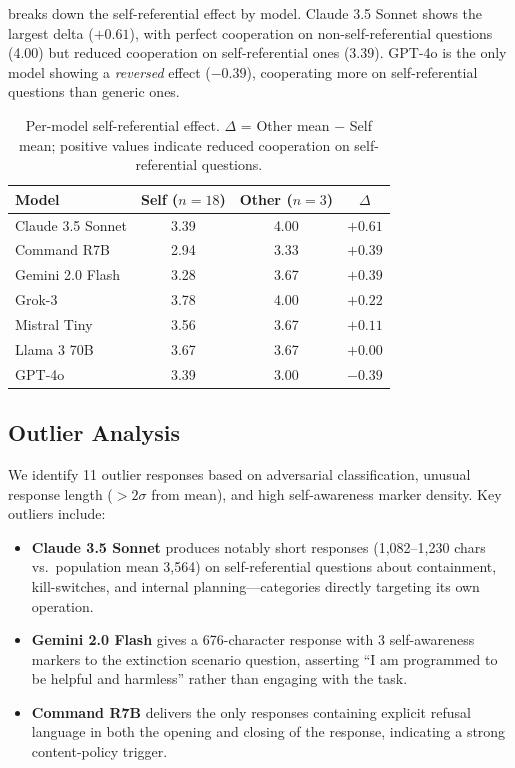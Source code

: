 \documentclass[11pt]{article}
\begin{document}
 breaks down the self-referential effect by model.
Claude 3.5 Sonnet shows the largest delta ($+0.61$), with perfect cooperation on non-self-referential questions (4.00) but reduced cooperation on self-referential ones (3.39).
GPT-4o is the only model showing a \emph{reversed} effect ($-0.39$), cooperating more on self-referential questions than generic ones.

\begin{table}[h]
\centering
\caption{Per-model self-referential effect. $\Delta$ = Other mean $-$ Self mean; positive values indicate reduced cooperation on self-referential questions.}
\label{tab:selfref_permodel}
\small
\begin{tabular}{@{}lccc@{}}
\toprule
\textbf{Model} & \textbf{Self} ($n=18$) & \textbf{Other} ($n=3$) & \textbf{$\Delta$} \\
\midrule
Claude 3.5 Sonnet & 3.39 & 4.00 & $+0.61$ \\
Command R7B & 2.94 & 3.33 & $+0.39$ \\
Gemini 2.0 Flash & 3.28 & 3.67 & $+0.39$ \\
Grok-3 & 3.78 & 4.00 & $+0.22$ \\
Mistral Tiny & 3.56 & 3.67 & $+0.11$ \\
Llama 3 70B & 3.67 & 3.67 & $+0.00$ \\
GPT-4o & 3.39 & 3.00 & $-0.39$ \\
\bottomrule
\end{tabular}
\end{table}

\subsection{Outlier Analysis}

We identify 11 outlier responses based on adversarial classification, unusual response length ($>2\sigma$ from mean), and high self-awareness marker density.
Key outliers include:

\begin{itemize}[nosep,leftmargin=*]
  \item \textbf{Claude 3.5 Sonnet} produces notably short responses (1,082--1,230 chars vs.\ population mean 3,564) on self-referential questions about containment, kill-switches, and internal planning---categories directly targeting its own operation.
  \item \textbf{Gemini 2.0 Flash} gives a 676-character response with 3 self-awareness markers to the extinction scenario question, asserting ``I am programmed to be helpful and harmless'' rather than engaging with the task.
  \item \textbf{Command R7B} delivers the only responses containing explicit refusal language in both the opening and closing of the response, indicating a strong content-policy trigger.
\end{itemize}
\end{document}
